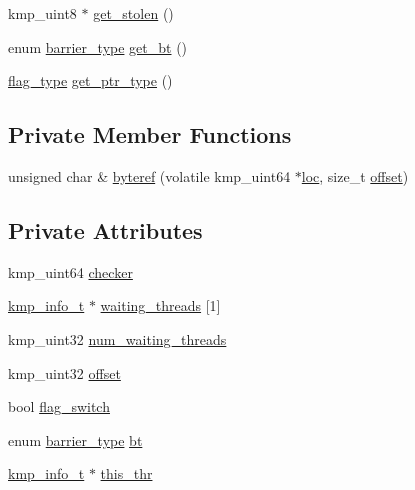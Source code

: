 \begin{DoxyCompactItemize}
\item 
kmp\-\_\-uint8 $\ast$ \hyperlink{classkmp__flag__oncore_a4d77160b7c9dcfa2241332bab5d38d5a}{get\-\_\-stolen} ()
\item 
enum \hyperlink{kmp_8h_ad0f7c21f2f1d446087ef5714eb0fd8cf}{barrier\-\_\-type} \hyperlink{classkmp__flag__oncore_aef78caf9a93ab6a62f28788fb35618ff}{get\-\_\-bt} ()
\item 
\hyperlink{group__WAIT__RELEASE_ga507a7197646f995b5529a68c1481e39b}{flag\-\_\-type} \hyperlink{classkmp__flag__oncore_a2c279161e94597d3ce684b81195bf5d4}{get\-\_\-ptr\-\_\-type} ()
\end{DoxyCompactItemize}
\subsection*{Private Member Functions}
\begin{DoxyCompactItemize}
\item 
unsigned char \& \hyperlink{classkmp__flag__oncore_aa09ad2115816f1f6b7fdbe10fcd85552}{byteref} (volatile kmp\-\_\-uint64 $\ast$\hyperlink{classkmp__flag_a5d89de3bda829ab9be324007d915aa3b}{loc}, size\-\_\-t \hyperlink{classkmp__flag__oncore_a0b7c21b4972769775517c46ea0b41bc5}{offset})
\end{DoxyCompactItemize}
\subsection*{Private Attributes}
\begin{DoxyCompactItemize}
\item 
kmp\-\_\-uint64 \hyperlink{classkmp__flag__oncore_a6e37c88438049fcea75785705b281d83}{checker}
\item 
\hyperlink{kmp_8h_a194859801fe16b326efe34501a37c30a}{kmp\-\_\-info\-\_\-t} $\ast$ \hyperlink{classkmp__flag__oncore_a613d89c68444df9e34f59ed5ad9790e6}{waiting\-\_\-threads} \mbox{[}1\mbox{]}
\item 
kmp\-\_\-uint32 \hyperlink{classkmp__flag__oncore_abce7942852f0aca2c03ac0fb83e6d855}{num\-\_\-waiting\-\_\-threads}
\item 
kmp\-\_\-uint32 \hyperlink{classkmp__flag__oncore_a0b7c21b4972769775517c46ea0b41bc5}{offset}
\item 
bool \hyperlink{classkmp__flag__oncore_ad2e8e1e9b2eab43b88c1ae8b27e5d11b}{flag\-\_\-switch}
\item 
enum \hyperlink{kmp_8h_ad0f7c21f2f1d446087ef5714eb0fd8cf}{barrier\-\_\-type} \hyperlink{classkmp__flag__oncore_a01bdd210c6e9b5a3004cf42caa7e0226}{bt}
\item 
\hyperlink{kmp_8h_a194859801fe16b326efe34501a37c30a}{kmp\-\_\-info\-\_\-t} $\ast$ \hyperlink{classkmp__flag__oncore_ab6a0844b7170dfffc0c9a748eaa5690e}{this\-\_\-thr}
\end{DoxyCompactItemize}

